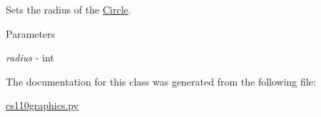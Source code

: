 Sets the radius of the \hyperlink{classcs110graphics_1_1Circle}{Circle}. 
\begin{DoxyParams}{Parameters}
\item[{\em radius}]-\/ int \end{DoxyParams}


The documentation for this class was generated from the following file:\begin{DoxyCompactItemize}
\item 
\hyperlink{cs110graphics_8py}{cs110graphics.py}\end{DoxyCompactItemize}
